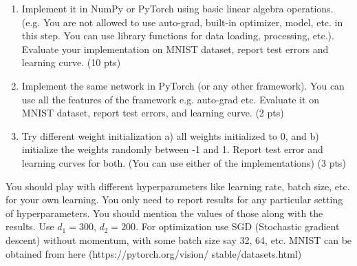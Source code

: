 \documentclass[a4paper]{article}
\theoremstyle{definition}
\begin{document}
\begin{enumerate}
	\item Implement it in NumPy or PyTorch using basic linear algebra operations. (e.g. You are not allowed to use auto-grad, built-in optimizer, model, etc. in this step. You can use library functions for data loading, processing, etc.). Evaluate your implementation on MNIST dataset, report test errors and learning curve. (10 pts)
	\item Implement the same network in PyTorch (or any other framework). You can use all the features of the framework e.g. auto-grad etc. Evaluate it on MNIST dataset, report test errors, and learning curve. (2 pts)
	\item Try different weight initialization a) all weights initialized to 0, and b) initialize the weights randomly between -1 and 1. Report test error and learning curves for both. (You can use either of the implementations) (3 pts)
\end{enumerate}

You should play with different hyperparameters like learning rate, batch size, etc. for your own learning. You only need to report results for any particular setting of hyperparameters. You should mention the values of those along with the results. Use $d_1 = 300$, $d_2 = 200$. For optimization use SGD (Stochastic gradient descent) without momentum, with some batch size say 32, 64, etc. MNIST can be obtained from here (https://pytorch.org/vision/ stable/datasets.html)


\end{document}
